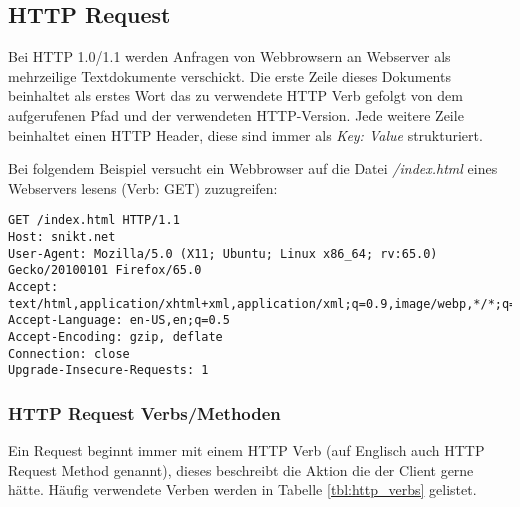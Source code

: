 \subsection{HTTP Request}

Bei HTTP 1.0/1.1 werden Anfragen von Webbrowsern an Webserver als mehrzeilige Textdokumente verschickt. Die erste Zeile dieses Dokuments beinhaltet als erstes Wort das zu verwendete HTTP Verb gefolgt von dem aufgerufenen Pfad und der verwendeten HTTP-Version. Jede weitere Zeile beinhaltet einen HTTP Header, diese sind immer als \textit{Key: Value} strukturiert.

Bei folgendem Beispiel versucht ein Webbrowser auf die Datei \textit{/index.html} eines Webservers lesens (Verb: GET) zuzugreifen:

\begin{verbatim}
GET /index.html HTTP/1.1
Host: snikt.net
User-Agent: Mozilla/5.0 (X11; Ubuntu; Linux x86_64; rv:65.0) Gecko/20100101 Firefox/65.0
Accept: text/html,application/xhtml+xml,application/xml;q=0.9,image/webp,*/*;q=0.8
Accept-Language: en-US,en;q=0.5
Accept-Encoding: gzip, deflate
Connection: close
Upgrade-Insecure-Requests: 1
\end{verbatim}

\subsubsection{HTTP Request Verbs/Methoden}

Ein Request beginnt immer mit einem HTTP Verb (auf Englisch auch HTTP Request Method genannt), dieses beschreibt die Aktion die der Client gerne hätte. Häufig verwendete Verben werden in Tabelle \ref{tbl:http_verbs} gelistet.

